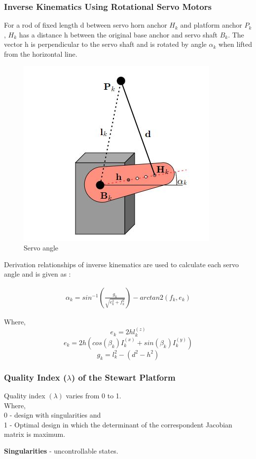 \subsubsection{Inverse Kinematics Using Rotational Servo Motors}
For a rod of fixed length d between servo horn anchor $H_{k}$ and platform anchor $P_{k}$,  $H_{k}$ has a distance h between the original base anchor and servo shaft $B_{k}$. The vector h is perpendicular to the servo shaft and is rotated by angle $\alpha_{k}$ when lifted from the horizontal line.
\begin{center}
	\begin{figure}[!h]
		\centering
		\includegraphics[width=0.4\linewidth]{Figures/servo}
		\caption[Servo angle]{Servo angle \cite{Eisele_2019}}
	\end{figure}
\end{center}
Derivation relationships of inverse kinematics are used to calculate each servo angle and is given as \cite{Eisele_2019}:
\begin{ceqn}
	\begin{align}
		\alpha_{k} = sin^{-1}(\frac{g_{k}}{\sqrt{e_{k}^2+f_{k}^2}})-arctan2(f_{k}, e_{k})
	\end{align}
\end{ceqn}
Where,
$$e_{k} = 2hl_{k}^{(z)} $$
$$e_{k} = 2h(cos(\beta_{k})I_{k}^{(x)}+sin({\beta_{k}})I_{k}^(y))$$
$$g_{k} = l_{k}^2 - (d^2 - h^2)   $$

\subsubsection{Quality Index ($\lambda$) of the Stewart Platform}
Quality index $(\lambda)$ varies from 0 to 1.\\
Where,\\
0 - design with singularities and\\
1 - Optimal design in which the determinant of the correspondent Jacobian matrix is maximum.

\textbf{Singularities} - uncontrollable states.

